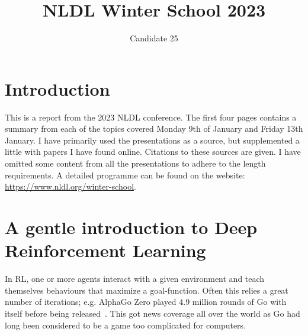 \documentclass[10pt,twocolumn,letterpaper]{article}
\begin{document}
\title{NLDL Winter School 2023}

\author{Candidate 25}
\maketitle

\section{Introduction} \label{sec:intro}
This is a report from the 2023  \gls{NLDL} conference. The first four pages contains a summary from each of the topics covered Monday 9th of January and Friday 13th January. I have primarily used the presentations as a source, but supplemented a little with papers I have found online. Citations to these sources are given. 
I have omitted some content from all the presentations to adhere to the length requirements. A detailed programme can be found on the website: \href{https://www.nldl.org/winter-school}{https://www.nldl.org/winter-school}. 

\section{A gentle introduction to Deep Reinforcement Learning}\label{sec:drl}

In \gls{RL}, one or more agents interact with a given environment and teach themselves 
behaviours that maximize a goal-function. Often this relies a great number of iterations; e.g. AlphaGo Zero played 4.9 million rounds of Go with itself before being released~\cite{goWithoutHumans}. This got news coverage all over the world as Go had long been considered to be a game too complicated for computers.
\end{document}
